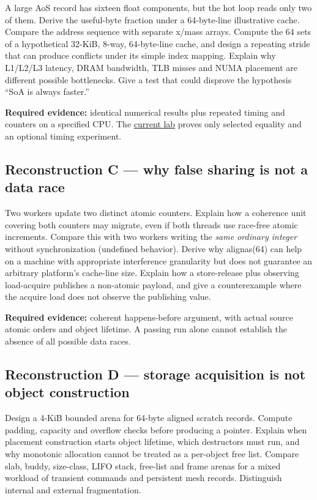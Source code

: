 A large AoS record has sixteen float components, but the hot loop reads only two of them. Derive the useful-byte fraction under a 64-byte-line illustrative cache. Compare the address sequence with separate x/mass arrays. Compute the 64 sets of a hypothetical 32-KiB, 8-way, 64-byte-line cache, and design a repeating stride that can produce conflicts under its simple index mapping. Explain why L1/L2/L3 latency, DRAM bandwidth, TLB misses and NUMA placement are different possible bottlenecks. Give a test that could disprove the hypothesis ``SoA is always faster.''

\textbf{Required evidence:} identical numerical results plus repeated timing and counters on a specified CPU. The \hyperref[source-file-0060a91bd24dd25d6c14e679]{current lab} proves only selected equality and an optional timing experiment.

\subsection{Reconstruction C --- why false sharing is not a data race}\label{appendix-2587680a4fe3-reconstruction-c-why-false-sharing-is-not-a-data-race}

Two workers update two distinct atomic counters. Explain how a coherence unit covering both counters may migrate, even if both threads use race-free atomic increments. Compare this with two workers writing the \emph{same ordinary integer} without synchronization (undefined behavior). Derive why alignas(64) can help on a machine with appropriate interference granularity but does not guarantee an arbitrary platform's cache-line size. Explain how a store-release plus observing load-acquire publishes a non-atomic payload, and give a counterexample where the acquire load does not observe the publishing value.

\textbf{Required evidence:} coherent happens-before argument, with actual source atomic orders and object lifetime. A passing run alone cannot establish the absence of all possible data races.

\subsection{Reconstruction D --- storage acquisition is not object construction}\label{appendix-2587680a4fe3-reconstruction-d-storage-acquisition-is-not-object-construction}

Design a 4-KiB bounded arena for 64-byte aligned scratch records. Compute padding, capacity and overflow checks before producing a pointer. Explain when placement construction starts object lifetime, which destructors must run, and why monotonic allocation cannot be treated as a per-object free list. Compare slab, buddy, size-class, LIFO stack, free-list and frame arenas for a mixed workload of transient commands and persistent mesh records. Distinguish internal and external fragmentation.

